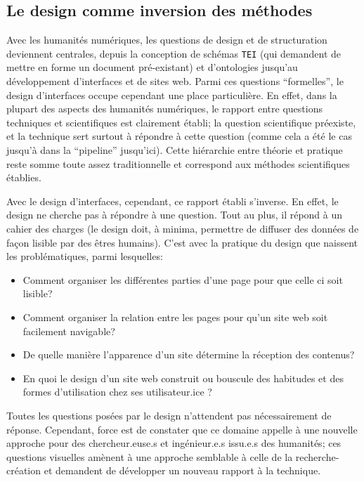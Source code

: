 \documentclass[a4paper, 12pt, twoside]{book}
\newcommand{\tei}{\texttt{TEI}}
\begin{document}
\subsection{Le design comme inversion des méthodes}
Avec les humanités numériques, les questions de design et de structuration deviennent centrales, depuis la conception de schémas \tei{} (qui demandent de mettre en forme un document pré-existant) et d'ontologies jusqu'au développement d'interfaces et de sites web. Parmi ces questions \enquote{formelles}, le design d'interfaces occupe cependant une place particulière. En effet, dans la plupart des aspects des humanités numériques, le rapport entre questions techniques et scientifiques est clairement établi; la question scientifique préexiste, et la technique sert surtout à répondre à cette question (comme cela a été le cas jusqu'à dans la \enquote{pipeline} jusqu'ici). Cette hiérarchie entre théorie et pratique reste somme toute assez traditionnelle et correspond aux méthodes scientifiques établies. 

Avec le design d'interfaces, cependant, ce rapport établi s'inverse. En effet, le design ne cherche pas à répondre à une question. Tout au plus, il répond à un cahier des charges (le design doit, à minima, permettre de diffuser des données de façon lisible par des êtres humains). C'est avec la pratique du design que naissent les problématiques, parmi lesquelles: \begin{itemize}
	\item Comment organiser les différentes parties d'une page pour que celle ci soit lisible? 
	\item Comment organiser la relation entre les pages pour qu'un site web soit facilement navigable? 
	\item De quelle manière l'apparence d'un site détermine la réception des contenus?
	\item En quoi le design d'un site web construit ou bouscule des habitudes et des formes d'utilisation chez ses utilisateur.ice ?
\end{itemize}
Toutes les questions posées par le design n'attendent pas nécessairement de réponse. Cependant, force est de constater que ce domaine appelle à une nouvelle approche pour des chercheur.euse.s et ingénieur.e.s issu.e.s des humanités; ces questions visuelles amènent à une approche semblable à celle de la recherche-création et demandent de développer un nouveau rapport à la technique.
\end{document}
